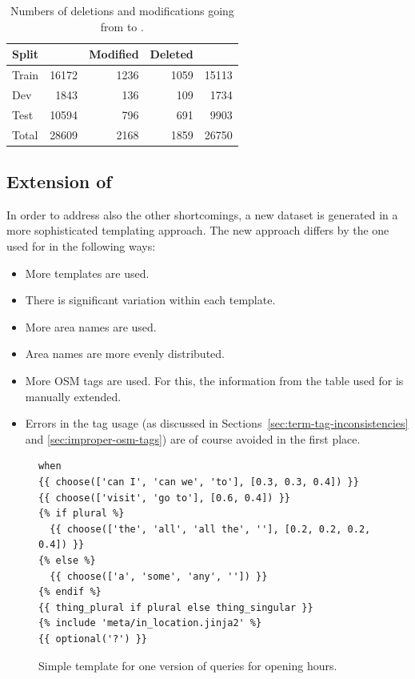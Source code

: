 \begin{table}
  \centering
  \begin{tabular}{lrrrr}
    \toprule
    Split & \nlmapstwo{} & Modified & Deleted & \nlmapstwoone{}\\
    \midrule
    Train & \num{16172} & \num{1236} & \num{1059} & \num{15113}\\
    Dev & \num{1843} & \num{136} & \num{109} & \num{1734}\\
    Test & \num{10594} & \num{796} & \num{691} & \num{9903}\\
    \midrule
    Total & \num{28609} & \num{2168} & \num{1859} & \num{26750}\\
    \bottomrule
  \end{tabular}
  \caption[\nlmapstwoone{} statistics]{Numbers of deletions and modifications
    going from \nlmapstwo{} to \nlmapstwoone{}.}
  \label{tab:nlmaps-v2.1-stats}
\end{table}

\subsection{Extension of \nlmapstwo{}}

In order to address also the other shortcomings, a new dataset is generated in a
more sophisticated templating approach. The new approach differs by the one used
for \nlmapstwo{} in the following ways:

\begin{itemize}
\item More templates are used.
\item There is significant variation within each template.
\item More area names are used.
\item Area names are more evenly distributed.
\item More OSM tags are used. For this, the information from the table used for
  \nlmapstwo{} is manually extended.
\item Errors in the tag usage (as discussed in
  Sections~\ref{sec:term-tag-inconsistencies} and \ref{sec:improper-osm-tags})
  are of course avoided in the first place.
\end{itemize}

\begin{figure}[h]
  \centering
  \begin{lstlisting}[style=MyJinja]
when
{{ choose(['can I', 'can we', 'to'], [0.3, 0.3, 0.4]) }}
{{ choose(['visit', 'go to'], [0.6, 0.4]) }}
{% if plural %}
  {{ choose(['the', 'all', 'all the', ''], [0.2, 0.2, 0.2, 0.4]) }}
{% else %}
  {{ choose(['a', 'some', 'any', '']) }}
{% endif %}
{{ thing_plural if plural else thing_singular }}
{% include 'meta/in_location.jinja2' %}
{{ optional('?') }}
  \end{lstlisting}
  \caption[Opening hours template]{Simple template for one version of queries
    for opening hours.}
  \label{fig:opening-hours-template}
\end{figure}


